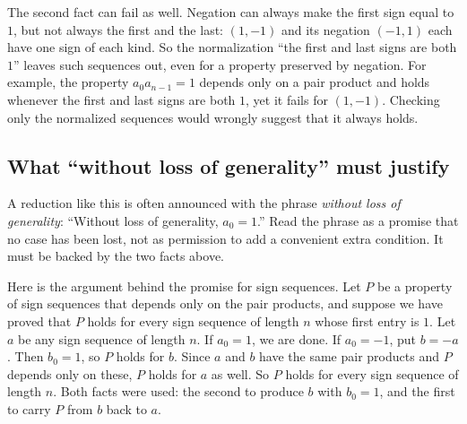 The second fact can fail as well. Negation can always make the first sign equal to $1$, but not always the first and the last: $(1,-1)$ and its negation $(-1,1)$ each have one sign of each kind. So the normalization ``the first and last signs are both $1$'' leaves such sequences out, even for a property preserved by negation. For example, the property $a_0a_{n-1}=1$ depends only on a pair product and holds whenever the first and last signs are both $1$, yet it fails for $(1,-1)$. Checking only the normalized sequences would wrongly suggest that it always holds.

\subsection*{What ``without loss of generality'' must justify}
A reduction like this is often announced with the phrase \emph{without loss of generality}: ``Without loss of generality, $a_0=1$.'' Read the phrase as a promise that no case has been lost, not as permission to add a convenient extra condition. It must be backed by the two facts above.

Here is the argument behind the promise for sign sequences. Let $P$ be a property of sign sequences that depends only on the pair products, and suppose we have proved that $P$ holds for every sign sequence of length $n$ whose first entry is $1$. Let $a$ be any sign sequence of length $n$. If $a_0=1$, we are done. If $a_0=-1$, put $b=-a$. Then $b_0=1$, so $P$ holds for $b$. Since $a$ and $b$ have the same pair products and $P$ depends only on these, $P$ holds for $a$ as well. So $P$ holds for every sign sequence of length $n$. Both facts were used: the second to produce $b$ with $b_0=1$, and the first to carry $P$ from $b$ back to $a$.

